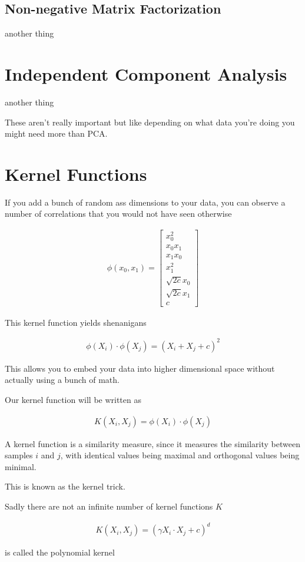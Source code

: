 \documentclass[fleqn]{report}
\newcommand{\equations} [1] {
\begin{gather*}
#1
\end{gather*}
}
\begin{document}
\subsection{Non-negative Matrix Factorization}
another thing 

\section{Independent Component Analysis}
another thing 

These aren't really important but like depending on what data you're 
doing you might need more than PCA. 

\section{Kernel Functions}
If you add a bunch of random ass dimensions to your data, you 
can observe a number of correlations that you would 
not have seen otherwise 
\equations{
    \phi(x_0, x_1)
    =
    \begin{bmatrix}
        x_0^2 \\
        x_0 x_1 \\
        x_1 x_0 \\
        x_1^2 \\
        \sqrt{2c} x_0 \\
        \sqrt{2c} x_1 \\
        c 
    \end{bmatrix}
}
This kernel function yields shenanigans 
\equations{
    \phi(X_i) \cdot \phi(X_j) = (X_i + X_j + c)^2
}
This allows you to embed your data into higher dimensional space 
without actually using a bunch of math. 

Our kernel function will be written as 
\equations{
    K(X_i, X_j) = 
    \phi(X_i) \cdot \phi(X_j)
}
A kernel function is a similarity measure, since it measures the 
similarity between samples $i$ and $j$, with identical values being 
maximal and orthogonal values being minimal. 

This is known as the kernel trick. 

Sadly there are not an infinite number of kernel functions $K$ 
\equations{
    K(X_i, X_j) = (\gamma X_i \cdot X_j + c)^d
}
is called the polynomial kernel 
\end{document}
